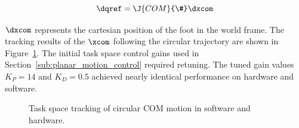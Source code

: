 \begin{equation}
	\dqref = \J{COM}{\#} \dxcom
	\label{eq:jcomcirc}
\end{equation}

$\dxcom$ represents the cartesian position of the foot in the world frame. The tracking results of the $\xcom$ following the circular trajectory are shown in Figure~\ref{fig:comcirctracking}. The initial task space control gains used in Section~\ref{sub:planar_motion_control} required retuning. The tuned gain values $K_P = 14$ and $K_D = 0.5$ achieved nearly identical performance on hardware and software. 

\begin{figure}[!h]
	\begin{center}
	\end{center}
  	\caption{Task space tracking of circular COM motion in software and hardware.}
	\label{fig:comcirctracking}
\end{figure} 

